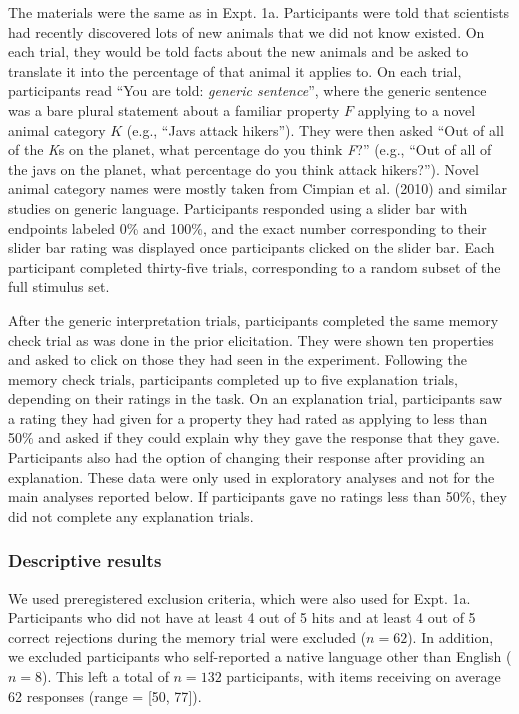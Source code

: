 \documentclass[floatsintext,doc]{apa6}
\begin{document}
The materials were the same as in Expt. 1a.
Participants were told that scientists had recently discovered lots of new animals that we did not know existed.
On each trial, they would be told facts about the new animals and be asked to translate it into the percentage of that animal it applies to.
On each trial, participants read \enquote{You are told: \emph{generic sentence}}, where the generic sentence was a bare plural statement about a familiar property \(F\) applying to a novel animal category \(K\) (e.g., \enquote{Javs attack hikers}).
They were then asked \enquote{Out of all of the \emph{K}s on the planet, what percentage do you think \emph{F}?} (e.g., \enquote{Out of all of the javs on the planet, what percentage do you think attack hikers?}).
Novel animal category names were mostly taken from Cimpian et al. (2010) and similar studies on generic language.
Participants responded using a slider bar with endpoints labeled 0\% and 100\%, and the exact number corresponding to their slider bar rating was displayed once participants clicked on the slider bar.
Each participant completed thirty-five trials, corresponding to a random subset of the full stimulus set.

After the generic interpretation trials, participants completed the same memory check trial as was done in the prior elicitation.
They were shown ten properties and asked to click on those they had seen in the experiment.
Following the memory check trials, participants completed up to five explanation trials, depending on their ratings in the task.
On an explanation trial, participants saw a rating they had given for a property they had rated as applying to less than 50\% and asked if they could explain why they gave the response that they gave.
Participants also had the option of changing their response after providing an explanation.
These data were only used in exploratory analyses and not for the main analyses reported below.
If participants gave no ratings less than 50\%, they did not complete any explanation trials.

\hypertarget{descriptive-results}{%
\subsubsection{Descriptive results}\label{descriptive-results}}

We used preregistered exclusion criteria, which were also used for Expt. 1a.
Participants who did not have at least 4 out of 5 hits and at least 4 out of 5 correct rejections during the memory trial were excluded (\(n = 62\)).
In addition, we excluded participants who self-reported a native language other than English (\(n = 8\)).
This left a total of \(n = 132\) participants, with items receiving on average 62 responses (range = {[}50, 77{]}).
\end{document}
